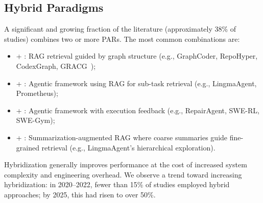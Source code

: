\subsection{Hybrid Paradigms}
\label{subsec:hybrid}

A significant and growing fraction of the literature (approximately 38\% of studies) combines
two or more PARs. The most common combinations are:

\begin{itemize}
  \item {} + : RAG retrieval guided by graph structure (e.g., GraphCoder,
    RepoHyper, CodexGraph, GRACG~\cite{fedorov2025gracg});
  \item {} + : Agentic framework using RAG for sub-task retrieval
    (e.g., LingmaAgent, Prometheus);
  \item {} + : Agentic framework with execution feedback
    (e.g., RepairAgent, SWE-RL, SWE-Gym);
  \item {} + : Summarization-augmented RAG where coarse summaries guide
    fine-grained retrieval (e.g., LingmaAgent's hierarchical exploration).
\end{itemize}

Hybridization generally improves performance at the cost of increased system complexity and
engineering overhead. We observe a trend toward increasing hybridization: in 2020--2022, fewer
than 15\% of studies employed hybrid approaches; by 2025, this had risen to over 50\%.
